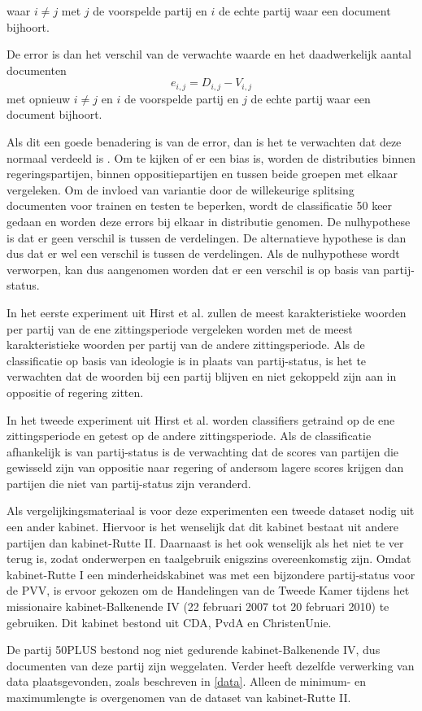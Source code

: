 waar $i\neq j$ met $j$ de voorspelde partij en $i$ de echte partij waar een document bijhoort.\par
De error is dan het verschil van de verwachte waarde en het daadwerkelijk aantal documenten
\begin{equation}
\label{eq:error}
e_{i,j} = D_{i,j} - V_{i,j}
\end{equation}
met opnieuw $i\neq j$ en $i$ de voorspelde partij en $j$ de echte partij waar een document bijhoort. \par
Als dit een goede benadering is van de error, dan is het te verwachten dat deze normaal verdeeld is \cite{citeulike:7531484}. Om te kijken of er een bias is, worden de distributies binnen regeringspartijen, binnen oppositiepartijen en tussen beide groepen met elkaar vergeleken. Om de invloed van variantie door de willekeurige splitsing documenten voor trainen en testen te beperken, wordt de classificatie 50 keer gedaan en worden deze errors bij elkaar in distributie genomen. De nulhypothese is dat er geen verschil is tussen de verdelingen. De alternatieve hypothese is dan dus dat er wel een verschil is tussen de verdelingen. Als de nulhypothese wordt verworpen, kan dus aangenomen worden dat er een verschil is op basis van partij-status.\par
In het eerste experiment uit Hirst et al. zullen de meest karakteristieke woorden per partij van de ene zittingsperiode vergeleken worden met de meest karakteristieke woorden per partij van de andere zittingsperiode. Als de classificatie op basis van ideologie is in plaats van partij-status, is het te verwachten dat de woorden bij een partij blijven en niet gekoppeld zijn aan in oppositie of regering zitten. \par
In het tweede experiment uit Hirst et al. worden classifiers getraind op de ene zittingsperiode en getest op de andere zittingsperiode. Als de classificatie afhankelijk is van partij-status is de verwachting dat de scores van partijen die gewisseld zijn van oppositie naar regering of andersom lagere scores krijgen dan partijen die niet van partij-status zijn veranderd.\par
Als vergelijkingsmateriaal is voor deze experimenten een tweede dataset nodig uit een ander kabinet. Hiervoor is het wenselijk dat dit kabinet bestaat uit andere partijen dan kabinet-Rutte II. Daarnaast is het ook wenselijk als het niet te ver terug is, zodat onderwerpen en taalgebruik enigszins overeenkomstig zijn. Omdat kabinet-Rutte I een minderheidskabinet was met een bijzondere partij-status voor de PVV, is ervoor gekozen om de Handelingen van de Tweede Kamer tijdens het missionaire kabinet-Balkenende IV (22 februari 2007 tot 20 februari 2010) te gebruiken. Dit kabinet bestond uit CDA, PvdA en ChristenUnie.\par
De partij 50PLUS bestond nog niet gedurende kabinet-Balkenende IV, dus documenten van deze partij zijn weggelaten. Verder heeft dezelfde verwerking van data plaatsgevonden, zoals beschreven in \ref{data}. Alleen de minimum- en maximumlengte is overgenomen van de dataset van kabinet-Rutte II.\par

